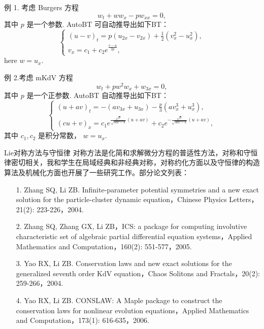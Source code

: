 \documentclass{beamer}
\begin{document}
\begin{frame}
例 1. 考虑 Burgers 方程
\begin{equation}
w_t + ww_x - pw_{xx}=0,
\end{equation}
其中 $p$ 是一个参数. AutoBT 可自动推导出如下BT：
\begin{equation}\label{Burgers_BT}
\left \{
\begin{array}{ll}
(u-v)_t=p(u_{2x}-v_{2x})+\frac{1}{2}(v_x^2-u_x^2), \\[2mm]
v_x=c_1+c_2e^{\frac{v-u}{2p}},
\end{array}
\right.
\end{equation}
here $w=u_x$.
\end{frame}

\begin{frame}
例 2.考虑 mKdV 方程
\begin{equation}
w_t + pw^2w_x+w_{3x}=0,
\end{equation}
其中 $p$ 是一个正参数. AutoBT 自动推导出如下BT：
\begin{equation}\label{Burgers_BT}
\left \{
\begin{array}{ll}
(u+av)_t=-(av_{3x}+u_{3x})-\frac{p}{3}(av_x^3+u_x^3), \\[2mm]
(cu+v)_x=c_1e^{\frac{\sqrt{p}}{\sqrt{3ac-3}}(u+av)}+c_2e^{-\frac{\sqrt{p}}{\sqrt{3ac-3}}(u+av)},
\end{array}
\right.
\end{equation}
其中 $c_1,c_2$ 是积分常数， $w=u_x$.
\end{frame}

\begin{frame}{Lie对称方法与守恒律}
 对称方法是化简和求解微分方程的普适性方法，对称和守恒律密切相关，我和学生在局域经典和非经典对称，对称约化方面以及守恒律的构造算法及机械化方面也开展了一些研究工作。部分论文列表：
 \begin{itemize}
  \item[1.] Zhang SQ, Li ZB. Infinite-parameter potential symmetries and a new exact solution for the particle-cluster dynamic equation，Chinese Physics Letters，21(2): 223-226，2004.
  \item[2.] Zhang SQ, Zhang GX, Li ZB，ICS: a package for computing involutive characteristic set of algebraic partial differential equation systems，Applied Mathematics and Computation，160(2): 551-577，2005.
 \end{itemize}
\end{frame}

\begin{frame}
 \begin{itemize}
  \item[3.] Yao RX, Li ZB. Conservation laws and new exact solutions for the generalized seventh order KdV equation，Chaos Solitons and Fractals，20(2): 259-266，2004.
  \item[4.] Yao RX, Li ZB. CONSLAW: A Maple package to construct the conservation laws for nonlinear evolution equations，Applied Mathematics and Computation，173(1): 616-635，2006.
 \end{itemize}
\end{frame}
\end{document}
